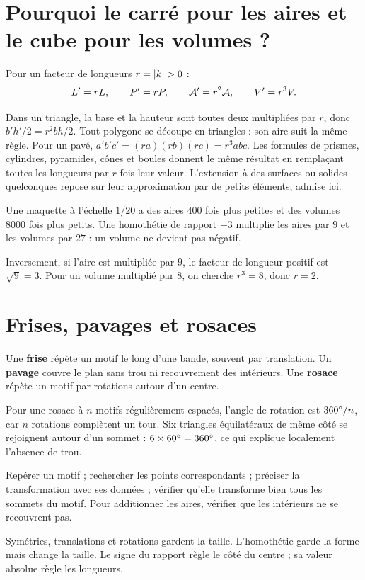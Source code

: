 \documentclass[../cours_3e.tex]{subfiles}
\begin{document}
\section{Pourquoi le carré pour les aires et le cube pour les volumes ?}
\begin{propriete}
Pour un facteur de longueurs $r=\abs k>0$ :
\[L'=rL,\qquad P'=rP,\qquad \mathcal{A}'=r^2\mathcal{A},\qquad V'=r^3V.\]
\end{propriete}
\begin{demonstration}
Dans un triangle, la base et la hauteur sont toutes deux multipliées par $r$, donc $b'h'/2=r^2bh/2$. Tout polygone se découpe en triangles : son aire suit la même règle. Pour un pavé, $a'b'c'=(ra)(rb)(rc)=r^3abc$. Les formules de prismes, cylindres, pyramides, cônes et boules donnent le même résultat en remplaçant toutes les longueurs par $r$ fois leur valeur. L'extension à des surfaces ou solides quelconques repose sur leur approximation par de petits éléments, admise ici.
\end{demonstration}
\begin{exemple}
Une maquette à l'échelle $1/20$ a des aires $400$ fois plus petites et des volumes $8000$ fois plus petits. Une homothétie de rapport $-3$ multiplie les aires par $9$ et les volumes par $27$ : un volume ne devient pas négatif.
\end{exemple}
Inversement, si l'aire est multipliée par $9$, le facteur de longueur positif est $\sqrt9=3$. Pour un volume multiplié par $8$, on cherche $r^3=8$, donc $r=2$.
\section{Frises, pavages et rosaces}
Une \textbf{frise} répète un motif le long d'une bande, souvent par translation. Un \textbf{pavage} couvre le plan sans trou ni recouvrement des intérieurs. Une \textbf{rosace} répète un motif par rotations autour d'un centre.

Pour une rosace à $n$ motifs régulièrement espacés, l'angle de rotation est $360^{\circ}/n$, car $n$ rotations complètent un tour. Six triangles équilatéraux de même côté se rejoignent autour d'un sommet : $6\times60^{\circ}=360^{\circ}$, ce qui explique localement l'absence de trou.
\begin{methode}
Repérer un motif ; rechercher les points correspondants ; préciser la transformation avec ses données ; vérifier qu'elle transforme bien tous les sommets du motif. Pour additionner les aires, vérifier que les intérieurs ne se recouvrent pas.
\end{methode}
\begin{retenir}
Symétries, translations et rotations gardent la taille. L'homothétie garde la forme mais change la taille. Le signe du rapport règle le côté du centre ; sa valeur absolue règle les longueurs.
\end{retenir}
\end{document}
